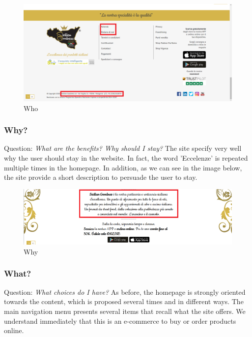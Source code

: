 \begin{figure}[H]
	\centering\includegraphics[width=12cm]{Img/who.png}
	\caption{Who}
\end{figure}

\subsubsection{Why?}

Question: \textit{What are the benefits? Why should I stay?}
\newline
The site specify very well why the user should stay in the website. In fact, the word 'Eccelenze' is repeated multiple times in the homepage.
In addition, as we can see in the image below, the site provide a short description to persuade the user to stay.
\begin{figure}[H]
	\centering\includegraphics[width=12cm]{Img/why.png}
	\caption{Why}
\end{figure}

\pagebreak

\subsubsection{What?}

Question: \textit{What choices do I have?}
\newline
As before, the homepage is strongly oriented towards the content, which is proposed several times and in different ways. The main navigation menu presents several items that recall what the site offers. We understand immediately that this is an e-commerce to buy or order products online.

